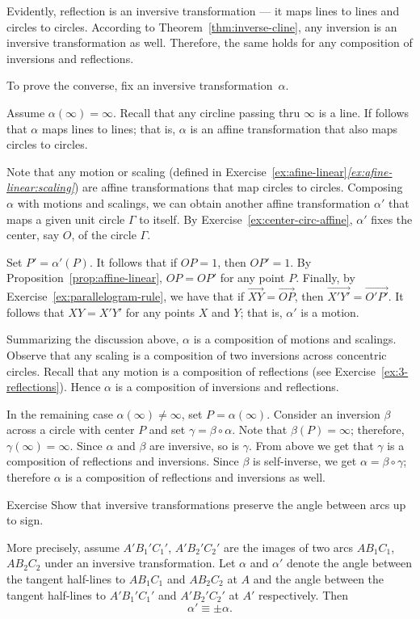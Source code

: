 Evidently, reflection is an inversive transformation --- it maps lines to lines and circles to circles.
According to Theorem~\ref{thm:inverse-cline}, any inversion is an inversive transformation as well.
Therefore, the same holds for any composition of inversions and reflections.

To prove the converse, 
fix an inversive transformation~$\alpha$.

Assume $\alpha(\infty)=\infty$.
Recall that any circline passing thru $\infty$ is a line.
If follows that $\alpha$ maps lines to lines;
that is,
$\alpha$ is an affine transformation that also maps circles to circles.

Note that any motion or scaling (defined in Exercise~\ref{ex:afine-linear}\textit{\ref{ex:afine-linear:scaling}}) are affine transformations that map circles to circles.
Composing $\alpha$ with motions and scalings, we can obtain another affine transformation $\alpha'$ that maps a given unit circle $\Gamma$ to itself.
By Exercise~\ref{ex:center-circ-affine},
$\alpha'$ fixes the center, say $O$, of the circle $\Gamma$.

Set $P'=\alpha'(P)$.
It follows that if $OP=1$, then $OP'=1$.
By Proposition~\ref{prop:affine-linear}, $OP=OP'$ for any point $P$.
Finally, by Exercise~\ref{ex:parallelogram-rule}, we have that if 
$\overrightarrow{XY}=\overrightarrow{OP}$, then $\overrightarrow{X'Y'}=\overrightarrow{O'P'}$.
It follows that $XY=X'Y'$ for any points $X$ and $Y$;
that is, $\alpha'$ is a motion.

Summarizing the discussion above, $\alpha$ is a composition of motions and scalings.
Observe that any scaling is a composition of two inversions across concentric circles.
Recall that any motion is a composition of reflections (see Exercise~\ref{ex:3-reflections}).
Hence $\alpha$ is a composition of inversions and reflections.


In the remaining case $\alpha(\infty)\ne \infty$, set $P=\alpha(\infty)$.
Consider an inversion $\beta$ across a circle with center $P$ and set $\gamma=\beta\circ\alpha$.
Note that $\beta(P)=\infty$; 
therefore, $\gamma(\infty)=\infty$.
Since $\alpha$ and $\beta$ are inversive, so is $\gamma$.
From above we get that $\gamma$ is a composition of reflections and inversions.
Since $\beta$ is self-inverse, we get
$\alpha=\beta\circ\gamma$;
therefore $\alpha$ is a composition of reflections and inversions as well.
\qeds

\begin{thm}{Exercise}\label{ex:inversive-angle}
Show that inversive transformations preserve the angle between arcs up to sign.

More precisely, assume $A'B_1'C_1'$, $A'B_2'C_2'$ are the images of two arcs $AB_1C_1$, $AB_2C_2$ under an inversive transformation.
Let $\alpha$ and $\alpha'$ denote the angle between the tangent half-lines to $AB_1C_1$ and $AB_2C_2$ at $A$
and the angle between the tangent half-lines to $A'B_1'C_1'$ and $A'B_2'C_2'$ at $A'$ respectively.
Then 
\[\alpha'\equiv\pm \alpha.\]
\end{thm}


